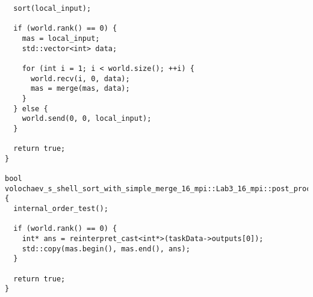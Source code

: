 \documentclass[12pt]{article}
\begin{document}
\begin{verbatim}
  sort(local_input);

  if (world.rank() == 0) {
    mas = local_input;
    std::vector<int> data;

    for (int i = 1; i < world.size(); ++i) {
      world.recv(i, 0, data);
      mas = merge(mas, data);
    }
  } else {
    world.send(0, 0, local_input);
  }

  return true;
}

bool volochaev_s_shell_sort_with_simple_merge_16_mpi::Lab3_16_mpi::post_processing() {
  internal_order_test();

  if (world.rank() == 0) {
    int* ans = reinterpret_cast<int*>(taskData->outputs[0]);
    std::copy(mas.begin(), mas.end(), ans);
  }

  return true;
}
\end{verbatim}
\end{document}
